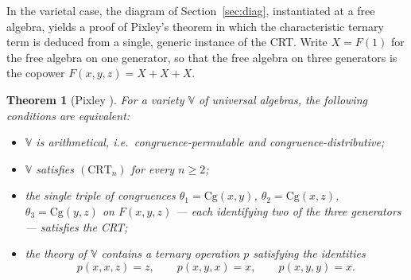 \documentclass[11pt,a4paper]{article}
\theoremstyle{plain}
\newtheorem{theoreme}{Theorem}[section]
\theoremstyle{definition}
\theoremstyle{remark}
\theoremstyle{plain}
\begin{document}
In the varietal case, the diagram of Section~\ref{sec:diag}, instantiated
at a free algebra, yields a proof of Pixley's theorem \cite{Pixley} in
which the characteristic ternary term is deduced from a single, generic instance
of the CRT. Write
$X = F(1)$ for the free algebra on one generator, so that the free algebra
on three generators is the copower $F(x,y,z) = X + X + X$.

\begin{theoreme}[Pixley \cite{Pixley}]\label{thm:pixley}
For a variety $\mathbb{V}$ of universal algebras, the following conditions
are equivalent:
\begin{itemize}
\item[(1)] $\mathbb{V}$ is arithmetical, i.e.\ congruence-permutable and
congruence-distributive;
\item[(2)] $\mathbb{V}$ satisfies $(\mathrm{CRT}_n)$ for every $n \ge 2$;
\item[(3)] the single triple of congruences
$\theta_1 = \mathrm{Cg}(x,y)$, $\theta_2 = \mathrm{Cg}(x,z)$,
$\theta_3 = \mathrm{Cg}(y,z)$ on $F(x,y,z)$ --- each identifying two of
the three generators --- satisfies the CRT;
\item[(4)] the theory of $\mathbb{V}$ contains a ternary operation $p$
satisfying the identities
\[
p(x,x,z) = z, \qquad p(x,y,x) = x, \qquad p(x,y,y) = x.
\]
\end{itemize}
\end{theoreme}
\end{document}
